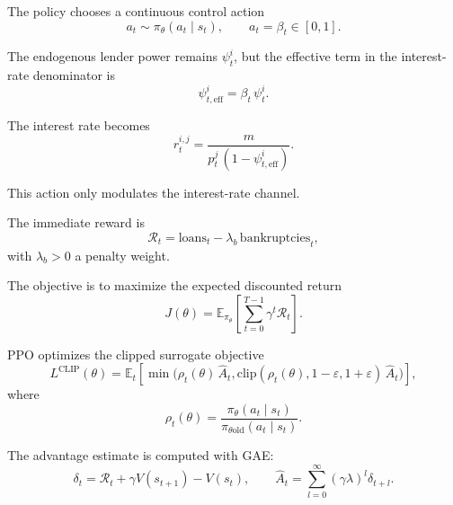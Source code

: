 \documentclass{article}
\begin{document}
The policy chooses a continuous control action
\[
a_t \sim \pi_\theta(a_t \mid s_t), \qquad a_t = \beta_t \in [0,1].
\]

The endogenous lender power remains $\psi_t^i$, but the effective term in the
interest-rate denominator is
\[
\psi_{t,\mathrm{eff}}^i = \beta_t\,\psi_t^i.
\]

The interest rate becomes
\[
r_t^{i,j} = \frac{m}{p_t^j\,(1 - \psi_{t,\mathrm{eff}}^i)}.
\]

This action only modulates the interest-rate channel.

The immediate reward is
\[
\mathcal{R}_t = \text{loans}_t - \lambda_b\,\text{bankruptcies}_t,
\]
with $\lambda_b > 0$ a penalty weight.

The objective is to maximize the expected discounted return
\[
J(\theta) = \mathbb{E}_{\pi_\theta}\left[ \sum_{t=0}^{T-1} \gamma^t \mathcal{R}_t \right].
\]

PPO optimizes the clipped surrogate objective
\[
L^{\mathrm{CLIP}}(\theta) =
\mathbb{E}_t\left[
\min\big(
\rho_t(\theta)\,\hat{A}_t,
\mathrm{clip}(\rho_t(\theta), 1-\varepsilon, 1+\varepsilon)\,\hat{A}_t
\big)
\right],
\]
where
\[
\rho_t(\theta) = \frac{\pi_\theta(a_t\mid s_t)}{\pi_{\theta\mathrm{old}}(a_t\mid s_t)}.
\]

The advantage estimate is computed with GAE:
\[
\delta_t = \mathcal{R}_t + \gamma V(s_{t+1}) - V(s_t),
\qquad
\hat{A}_t = \sum_{l=0}^{\infty} (\gamma \lambda)^l \delta_{t+l}.
\]
\end{document}
